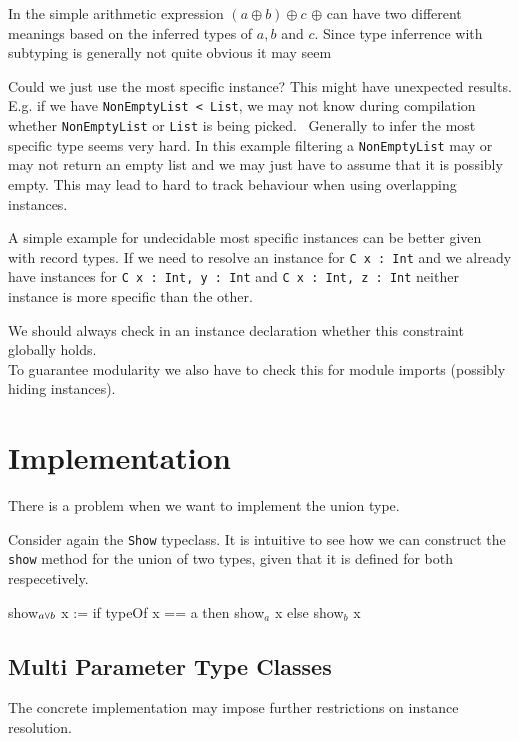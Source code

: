   In the simple arithmetic expression $(a \oplus b) \oplus c$ $\oplus$ can have two different meanings based on the inferred types of $a,b$ and $c$.
  Since type inferrence with subtyping is generally not quite obvious it may seem 

  Could we just use the most specific instance? This might have unexpected results.
  E.g. if we have \texttt{NonEmptyList < List}, we may not know during compilation whether \texttt{NonEmptyList} or \texttt{List} is being picked.
  ~Generally to infer the most specific type seems very hard. In this example filtering a \texttt{NonEmptyList} may or may not return an empty list and we may just have to assume that it is possibly empty.
  This may lead to hard to track behaviour when using overlapping instances.

  A simple example for undecidable most specific instances can be better given with record types.
  If we need to resolve an instance for \texttt{C {x : Int}} and we already have instances for \texttt{C {x : Int, y : Int}} and \texttt{C {x : Int, z : Int}} neither instance is more specific than the other.


  We should always check in an instance declaration whether this constraint globally holds. \\
  To guarantee modularity we also have to check this for module imports (possibly hiding instances).

\section{Implementation}

There is a problem when we want to implement the union type.

Consider again the \texttt{Show} typeclass. It is intuitive to see how we can construct the \texttt{show} method for the union of two types, given that it is defined for both respecetively.

\begin{listing}
  show$_{a\join b}$ x := if typeOf x == a then show$_a$ x else show$_b$ x
\end{listing}


\subsection{Multi Parameter Type Classes}

The concrete implementation may impose further restrictions on instance resolution.

